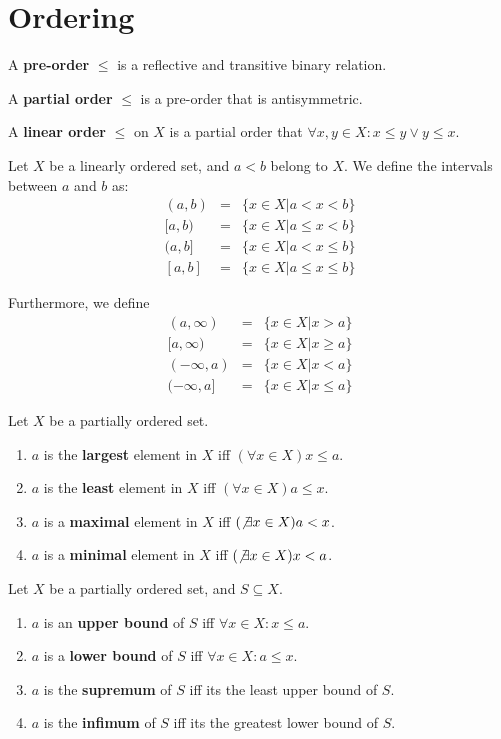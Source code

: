 \documentclass[12pt]{book}
\begin{document}
\chapter{Ordering}
\begin{definition}
	A {\bf pre-order} $\leq$ is a reflective and transitive binary relation.
\end{definition}
\begin{definition}
	A {\bf partial order} $\leq$ is a pre-order that is antisymmetric.
\end{definition}
\begin{definition}
	A {\bf linear order} $\leq$ on $X$ is a partial order that $\forall x,y\in X:x\leq y\vee y\leq x$.
\end{definition}
\begin{definition}
	Let $X$ be a linearly ordered set, and $a<b$ belong to $X$. We define the intervals between $a$ and $b$ as:
	\begin{eqnarray}
		(a,b)&=&\{x\in X|a<x<b\}\\{}
		[a,b)&=&\{x\in X|a\leq x<b\}\\
		(a,b]&=&\{x\in X|a<x\leq b\}\\{}
		[a,b]&=&\{x\in X|a\leq x\leq b\}
	\end{eqnarray}
	
	Furthermore, we define
	\begin{eqnarray}
		(a,\infty)&=&\{x\in X|x>a\}\\{}
		[a,\infty)&=&\{x\in X|x\geq a\}\\
		(-\infty,a)&=&\{x\in X|x<a\}\\{}
		(-\infty,a]&=&\{x\in X|x\leq a\}
	\end{eqnarray}
\end{definition}
\begin{definition}
	Let $X$ be a partially ordered set.
	\begin{enumerate}
		\item $a$ is the {\bf largest} element in $X$ iff $(\forall x\in X)x\leq a$.
		\item $a$ is the {\bf least} element in $X$ iff $(\forall x\in X)a\leq x$.
		\item $a$ is a {\bf maximal} element in $X$ iff $(\not\exists x\in X)a< x$.
		\item $a$ is a {\bf minimal} element in $X$ iff $(\not\exists  x\in X)x< a$.
	\end{enumerate} 
\end{definition}
\begin{definition}
	Let $X$ be a partially ordered set, and $S\subseteq X$.
	\begin{enumerate}
		\item $a$ is an {\bf upper bound} of $S$ iff $\forall x\in X:x\leq a$.
		\item $a$ is a {\bf lower bound} of $S$ iff $\forall x\in X:a\leq x$.
		\item $a$ is the {\bf supremum} of $S$ iff its the least upper bound of $S$.
		\item $a$ is the {\bf infimum} of $S$ iff its the greatest lower bound of $S$.
	\end{enumerate} 
\end{definition}
\end{document}

